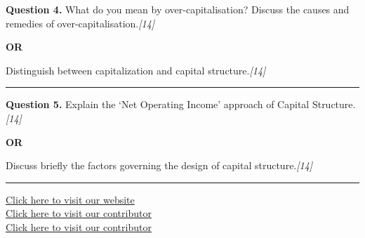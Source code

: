 \documentclass[11pt,a4paper]{article}
\newcommand{\pts}[1]{\hfill   \textit{[#1]}}
\begin{document}
\noindent   \textbf{Question 4.}
What do you mean by over-capitalisation? Discuss the causes and remedies of over-capitalisation.\pts{14}

\centerline{   \textbf{OR}}

Distinguish between capitalization and capital structure.\pts{14}

\medskip\rule{\linewidth}{0.2pt}




\noindent   \textbf{Question 5.}
Explain the `Net Operating Income' approach of Capital Structure.\pts{14}

\centerline{   \textbf{OR}}

Discuss briefly the factors governing the design of capital structure.\pts{14}

\vfill
\rule{\linewidth}{0.4pt}

\begin{center}\small
\href{https://bhu-exam.vercel.app/}{Click here to visit our website}\\[4pt]
\href{https://me-aryan.vercel.app/}{Click here to visit our contributor}\\[4pt]
\href{https://quashan-me.vercel.app/}{Click here to visit our contributor}
\end{center}
\end{document}
